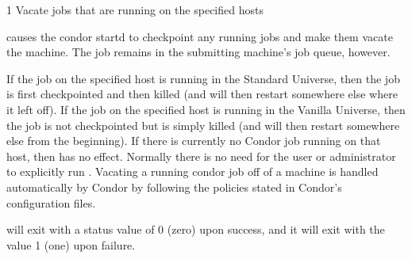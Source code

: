 \begin{ManPage}{\label{man-condor-vacate}}{1}
{Vacate jobs that are running on the specified hosts}
\Synopsis {}
\ToolArgsBase
{}
\ToolArgsLocate


\Description
{} causes the condor startd to checkpoint any running jobs
and make them vacate the machine. The job remains in
the submitting machine's job queue, however. 

If the job on the specified host is running in the Standard Universe, then the
job is first checkpointed and then killed (and will then restart somewhere
else where it left off). If the job on the specified host is running in the
Vanilla Universe, then the job is not checkpointed but is simply killed (and
will then restart somewhere else from the beginning). If there is currently
no Condor job running on that host, then  has no effect. 
 Normally there is no need for the user or administrator to explicitly run
. Vacating a running condor job off of a machine is handled
automatically by Condor by following the policies stated in Condor's
configuration files.   
\begin{Options}
	\ToolArgsBaseDesc
	\ToolArgsLocateDesc
\end{Options}

\ExitStatus

 will exit with a status value of 0 (zero) upon success,
and it will exit with the value 1 (one) upon failure.

\end{ManPage}

